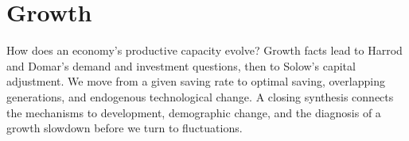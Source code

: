\clearpage
\part{Growth}\label{part:growth}

How does an economy's productive capacity evolve? Growth facts lead to
Harrod and Domar's demand and investment questions, then to Solow's capital
adjustment. We move from a given saving rate to optimal saving, overlapping
generations, and endogenous technological change. A closing synthesis connects
the mechanisms to development, demographic change, and the diagnosis of a
growth slowdown before we turn to fluctuations.









